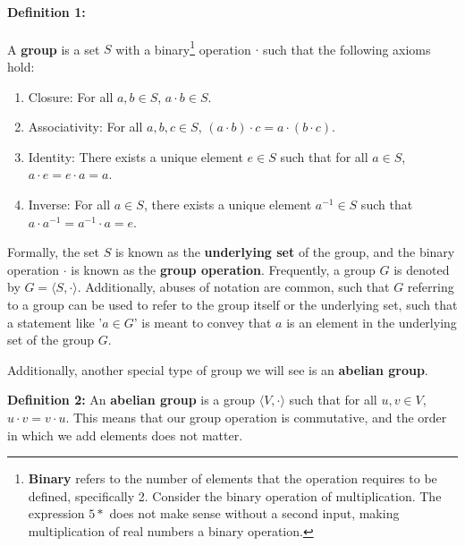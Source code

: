 \documentclass[twoside]{article}
\begin{document}
\paragraph*{Definition 1:} A \textbf{group} is a set $S$ with a binary\footnote[1]{\textbf{Binary} refers to the number of elements that the operation requires to be defined, specifically 2. Consider the binary operation of multiplication. The expression $5*$ does not make sense without a second input, making multiplication of real numbers a binary operation. }
operation $\cdot$ 
such that the following axioms hold:
\begin{enumerate}
    \item Closure: For all $a,b \in S$, $a \cdot b \in S$.
    \item Associativity: For all $a,b,c \in S$, $(a \cdot b) \cdot c = a \cdot (b \cdot c)$.
    \item Identity: There exists a unique element $e \in S$ such that for all $a \in S$, $a \cdot e = e \cdot a = a$.
    \item Inverse: For all $a \in S$, there exists a unique element $a^{-1} \in S$ such that $a \cdot a^{-1} = a^{-1} \cdot a = e$.
\end{enumerate}
Formally, the set $S$ is known as the \textbf{underlying set} of the group, and 
the binary operation $\cdot$ is known as the \textbf{group operation}. Frequently,
a group $G$ is denoted by $G = \langle S, \cdot \rangle$. Additionally, abuses 
of notation are common, such that $G$ referring to a group can be used to refer 
to the group itself or the underlying set, such that a statement like '$a\in G$'
is meant to convey that $a$ is an element in the underlying set of the group $G$.

Additionally, another special type of group we will see is an \textbf{abelian group}.

\textbf{Definition 2:} An \textbf{abelian group} is a group $\langle V, \cdot \rangle$
such that for all $u,v \in V$, $u\cdot v = v\cdot u$. This means that our group operation 
is commutative, and the order in which we add elements does not matter.
\end{document}
